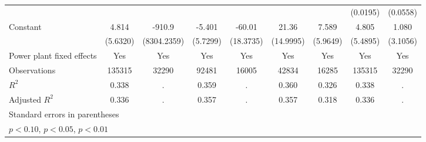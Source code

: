 {\begin{tabular}{l*{8}{c}}
                    &                     &                     &                     &                     &                     &                     &    (0.0195)         &    (0.0558)         \\
\addlinespace
Constant            &       4.814         &      -910.9         &      -5.401         &      -60.01\sym{***}&       21.36         &       7.589         &       4.805         &       1.080         \\
                    &    (5.6320)         & (8304.2359)         &    (5.7299)         &   (18.3735)         &   (14.9995)         &    (5.9649)         &    (5.4895)         &    (3.1056)         \\
\addlinespace
Power plant fixed effects&         Yes         &         Yes         &         Yes         &         Yes         &         Yes         &         Yes         &         Yes         &         Yes         \\
\midrule
Observations        &      135315         &       32290         &       92481         &       16005         &       42834         &       16285         &      135315         &       32290         \\
\(R^{2}\)           &       0.338         &           .         &       0.359         &           .         &       0.360         &       0.326         &       0.338         &           .         \\
Adjusted \(R^{2}\)  &       0.336         &           .         &       0.357         &           .         &       0.357         &       0.318         &       0.336         &           .         \\
\bottomrule
\multicolumn{9}{l}{\footnotesize Standard errors in parentheses}\\
\multicolumn{9}{l}{\footnotesize \sym{*} \(p<0.10\), \sym{**} \(p<0.05\), \sym{***} \(p<0.01\)}\\
\end{tabular}
}

